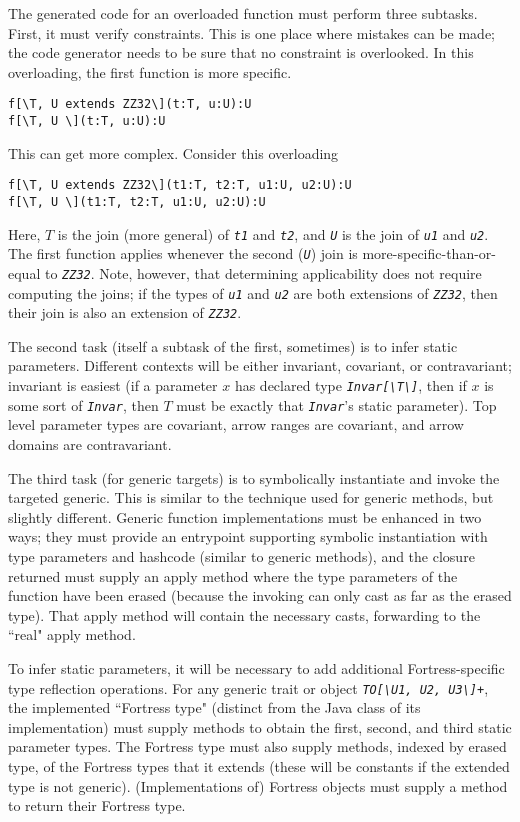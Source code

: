 \documentclass[11pt]{article}
\makeatletter
\newcommand{\ftt}[1]{{\tt\slshape{#1}}}
\def\BS{\textbackslash}
\newcommand{\slantverbatim}{\def\verbatim@font{\slshape\ttfamily\hyphenchar\font\m@ne\@noligs}}
\makeatother
\begin{document}
The generated code for an overloaded function must perform three subtasks.  First, it must verify constraints.  This is one place where mistakes can be made; the code generator needs to be sure that no constraint is overlooked.  In this overloading, the first function is more specific.  
{\slantverbatim
\begin{verbatim}
f[\T, U extends ZZ32\](t:T, u:U):U
f[\T, U \](t:T, u:U):U
\end{verbatim}
}
This can get more complex.  Consider this overloading
{\slantverbatim
\begin{verbatim}
f[\T, U extends ZZ32\](t1:T, t2:T, u1:U, u2:U):U
f[\T, U \](t1:T, t2:T, u1:U, u2:U):U
\end{verbatim}
}
Here, $T$ is the join (more general) of \ftt{t1} and \ftt{t2}, and \ftt{U} is the join of \ftt{u1} and \ftt{u2}.  The first function applies whenever the second (\ftt{U}) join is more-specific-than-or-equal to \ftt{ZZ32}.  Note, however, that determining applicability does not require computing the joins; if the types of \ftt{u1} and \ftt{u2} are both extensions of \ftt{ZZ32}, then their join is also an extension of \ftt{ZZ32}.

The second task (itself a subtask of the first, sometimes) is to infer static parameters.  Different contexts will be either invariant, covariant, or contravariant; invariant is easiest (if a parameter $x$ has declared type \ftt{Invar[\BS T\BS]}, then if $x$ is some sort of \ftt{Invar}, then $T$ must be exactly that \ftt{Invar}'s static parameter).  Top level parameter types are covariant, arrow ranges are covariant, and arrow domains are contravariant.

The third task (for generic targets) is to symbolically instantiate and invoke the targeted generic.  This is similar to the technique used for generic methods, but slightly different.  Generic function implementations must be enhanced in two ways; they must provide an entrypoint supporting symbolic instantiation with type parameters and hashcode (similar to generic methods), and the closure returned must supply an apply method where the type parameters of the function have been erased (because the invoking can only cast as far as the erased type).  That apply method will contain the necessary casts, forwarding to the ``real" apply method.

To infer static parameters, it will be necessary to add additional Fortress-specific type reflection operations.
For any generic trait or object \ftt{TO[\BS U1, U2, U3\BS]+}, the implemented ``Fortress type" (distinct from the Java class of its implementation) must supply methods to obtain the first, second, and third static parameter types.  The Fortress type must also supply methods, indexed by erased type, of the Fortress types that it extends (these will be constants if the extended type is not generic).  (Implementations of) Fortress objects must supply a method to return their Fortress type.
\end{document}
